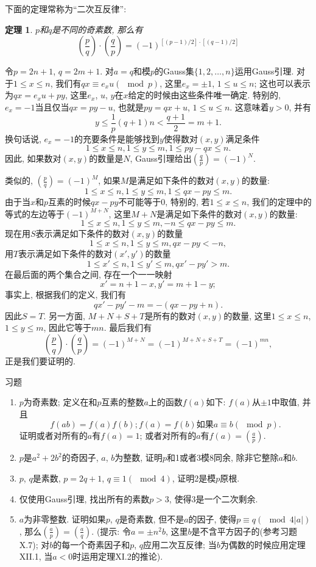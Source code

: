 \documentclass[12pt,a4paper]{book} %
\newtheorem{theorem}{定理}
\theoremstyle{remark}
\theoremstyle{example}
\theoremstyle{lemma}
\theoremstyle{corollary}
\numberwithin{theorem}{chapter}
\begin{document}
下面的定理常称为``二次互反律'':

\begin{theorem}
$p$和$q$是不同的奇素数, 那么有
\[
(\frac{p}{q}) \cdot (\frac{q}{p}) = (-1)^{[(p - 1) / 2] \cdot [(q - 1) / 2]}
\]
\end{theorem}

令$p = 2n + 1$, $q = 2m + 1$. 对$a = q$和模$p$的Gauss集$\{1, 2, \ldots, n\}$运用Gauss引理. 对于$1 \le x \le n$, 我们有$qx \equiv e_xu (\mod p)$, 这里$e_x = \pm 1$, $1 \le u \le n$; 这也可以表示为$qx = e_xu + py$, 这里$e_x$, $u$, $y$在$x$给定的时候由这些条件唯一确定. 特别的, $e_x = -1$当且仅当$qx = py - u$, 也就是$py = qx + u$, $1 \le u \le n$. 这意味着$y > 0$, 并有
\[
y \le \frac{1}{p}(q + 1)n < \frac{q + 1}{2} = m + 1.
\]
换句话说, $e_x = -1$的充要条件是能够找到$y$使得数对$(x, y)$满足条件
\[
1 \le x \le n, 1 \le y \le m, 1 \le py - qx \le n.
\]
因此, 如果数对$(x, y)$的数量是$N$, Gauss引理给出$(\frac{q}{p}) = (-1)^N$.

类似的, $(\frac{p}{q}) = (-1)^M$, 如果$M$是满足如下条件的数对$(x, y)$的数量:
\[
1 \le x \le n, 1 \le y \le m, 1 \le qx - py \le m.
\]
由于当$x$和$p$互素的时候$qx - py$不可能等于0, 特别的, 若$1 \le x \le n$, 我们的定理中的等式的左边等于$(-1)^{M + N}$, 这里$M + N$是满足如下条件的数对$(x, y)$的数量:
\[
1 \le x \le n, 1 \le y \le m, -n \le qx - py \le m.
\]
现在用$S$表示满足如下条件的数对$(x, y)$的数量
\[
1 \le x \le n, 1 \le y \le m, qx - py < -n,
\]
用$T$表示满足如下条件的数对$(x', y')$的数量
\[
1 \le x' \le n, 1 \le y' \le m, qx' - py' > m.
\]
在最后面的两个集合之间, 存在一个一一映射
\[
x' = n + 1 - x, y' = m + 1 - y;
\]
事实上, 根据我们的定义, 我们有
\[
qx' - py' - m = - (qx - py + n).
\]
因此$S = T$. 另一方面, $M + N + S + T$是所有的数对$(x, y)$的数量, 这里$1 \le x \le n$, $1 \le y \le m$, 因此它等于$mn$. 最后我们有
\[
(\frac{p}{q}) \cdot (\frac{q}{p}) = (-1)^{M + N} = (-1)^{M + N + S + T} = (-1)^{mn},
\]
正是我们要证明的.

习题

\begin{enumerate}
\item $p$为奇素数; 定义在和$p$互素的整数$a$上的函数$f(a)$如下: $f(a)$从$\pm 1$中取值, 并且
\[
f(ab) = f(a)f(b); f(a) = f(b) \text{如果} a \equiv b (\mod p).
\]
证明或者对所有的$a$有$f(a) = 1$; 或者对所有的$a$有$f(a) = (\frac{a}{p})$.

\item $p$是$a^2 + 2b^2$的奇因子, $a$, $b$为整数, 证明$p$和1或者3模8同余, 除非它整除$a$和$b$.

\item $p$, $q$是素数, $p = 2q + 1$, $q \equiv 1 (\mod 4)$, 证明2是模$p$原根.

\item 仅使用Gauss引理, 找出所有的素数$p > 3$, 使得3是一个二次剩余.

\item $a$为非零整数. 证明如果$p$, $q$是奇素数, 但不是$a$的因子, 使得$p \equiv q (\mod 4|a|)$, 那么$(\frac{a}{p}) = (\frac{a}{q})$. (提示: 令$a = \pm n^2b$, 这里$b$是不含平方因子的(参考习题X.7); 对$b$的每一个奇素因子和$p$, $q$应用二次互反律; 当$b$为偶数的时候应用定理XII.1, 当$a < 0$时运用定理XI.2的推论).

\end{enumerate}
\end{document}
